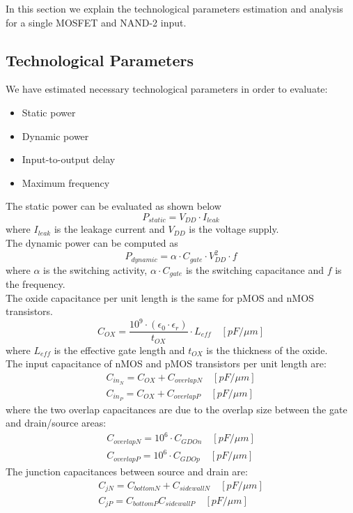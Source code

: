 In this section we explain the technological parameters estimation and analysis for a single MOSFET and NAND-2 input.
\subsection{Technological Parameters}
We have estimated necessary technological parameters in order to evaluate:
\begin{itemize}
\item Static power
\item Dynamic power
\item Input-to-output delay
\item Maximum frequency
\end{itemize}
The static power can be evaluated as shown below
\begin{equation}
P_{static}=V_{DD} \cdotp I_{leak}
\end{equation}
where $I_{leak}$ is the leakage current and $V_{DD}$ is the voltage supply. \\The dynamic power can be computed as
\begin{equation}
P_{dynamic}= \alpha \cdotp C_{gate} \cdotp V_{DD}^2 \cdotp f
\end{equation}
where $\alpha$ is the switching activity, $\alpha \cdotp C_{gate}$ is the switching capacitance and $f$ is the frequency. \\The oxide capacitance per unit length is the same for pMOS and nMOS transistors.
\begin{equation}
C_{OX}=\frac{10^9 \cdotp (\epsilon_0 \cdotp \epsilon_r)}{t_{OX}} \cdotp L_{eff} \quad [pF/\mu m]
\end{equation}
where $L_{eff}$ is the effective gate length and $t_{OX}$ is the thickness of the oxide. \\The input capacitance of nMOS and pMOS transistors per unit length are:
\begin{eqnarray}
C_{in_N}=C_{OX}+C_{overlapN} \quad [pF/\mu m]\\
C_{in_P}=C_{OX}+C_{overlapP} \quad [pF/\mu m]
\end{eqnarray}
where the two overlap capacitances are due to the overlap size between the gate and drain/source areas:
\begin{eqnarray}
C_{overlapN}=10^6 \cdotp C_{GDOn} \quad [pF/\mu m]\\
C_{overlapP}=10^6 \cdotp C_{GDOp} \quad [pF/\mu m]
\end{eqnarray}
The junction capacitances between source and drain are:
\begin{eqnarray}
C_{jN}=C_{bottomN} + C_{sidewallN} \quad [pF/\mu m]\\
C_{jP}=C_{bottomP} C_{sidewallP} \quad [pF/\mu m]
\end{eqnarray}
